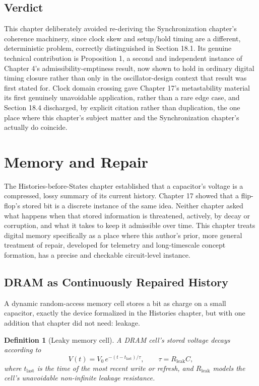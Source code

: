 \documentclass[12pt]{article}
\newtheorem{definition}{Definition}
\begin{document}
\subsection{Verdict}

This chapter deliberately avoided re-deriving the Synchronization chapter's coherence machinery, since clock skew and setup/hold timing are a different, deterministic problem, correctly distinguished in Section 18.1. Its genuine technical contribution is Proposition 1, a second and independent instance of Chapter 4's admissibility-emptiness result, now shown to hold in ordinary digital timing closure rather than only in the oscillator-design context that result was first stated for. Clock domain crossing gave Chapter 17's metastability material its first genuinely unavoidable application, rather than a rare edge case, and Section 18.4 discharged, by explicit citation rather than duplication, the one place where this chapter's subject matter and the Synchronization chapter's actually do coincide.

\section{Memory and Repair}

The Histories-before-States chapter established that a capacitor's voltage is a compressed, lossy summary of its current history. Chapter 17 showed that a flip-flop's stored bit is a discrete instance of the same idea. Neither chapter asked what happens when that stored information is threatened, actively, by decay or corruption, and what it takes to keep it admissible over time. This chapter treats digital memory specifically as a place where this author's prior, more general treatment of repair, developed for telemetry and long-timescale concept formation, has a precise and checkable circuit-level instance.

\subsection{DRAM as Continuously Repaired History}

A dynamic random-access memory cell stores a bit as charge on a small capacitor, exactly the device formalized in the Histories chapter, but with one addition that chapter did not need: leakage.

\begin{definition}[Leaky memory cell]
A DRAM cell's stored voltage decays according to
\[
V(t) = V_0\, e^{-(t-t_{\text{last}})/\tau}, \qquad \tau = R_{\text{leak}}C,
\]
where $t_{\text{last}}$ is the time of the most recent write or refresh, and $R_{\text{leak}}$ models the cell's unavoidable non-infinite leakage resistance.
\end{definition}
\end{document}

